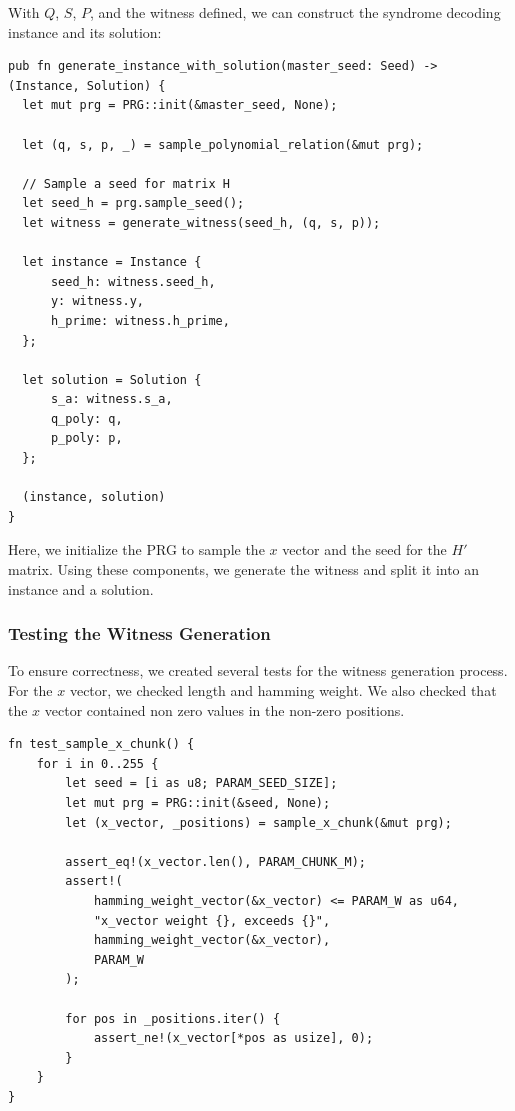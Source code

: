 \documentclass[11pt]{report}
\theoremstyle{definition}
\theoremstyle{plain}
\begin{document}
With $Q$, $S$, $P$, and the witness defined, we can construct the syndrome decoding instance and its solution:

\begin{verbatim}
pub fn generate_instance_with_solution(master_seed: Seed) -> (Instance, Solution) {
  let mut prg = PRG::init(&master_seed, None);

  let (q, s, p, _) = sample_polynomial_relation(&mut prg);

  // Sample a seed for matrix H
  let seed_h = prg.sample_seed();
  let witness = generate_witness(seed_h, (q, s, p));

  let instance = Instance {
      seed_h: witness.seed_h,
      y: witness.y,
      h_prime: witness.h_prime,
  };

  let solution = Solution {
      s_a: witness.s_a,
      q_poly: q,
      p_poly: p,
  };

  (instance, solution)
}
\end{verbatim}

Here, we initialize the PRG to sample the $x$ vector and the seed for the $H'$ matrix. Using these components, we generate the witness and split it into an instance and a solution.

\subsubsection{Testing the Witness Generation}\label{sub:testing_our_witness_generation}

To ensure correctness, we created several tests for the witness generation process. For the $x$ vector, we checked length and hamming weight. We also checked that the $x$ vector contained non zero values in the non-zero positions.

\begin{verbatim}
fn test_sample_x_chunk() {
    for i in 0..255 {
        let seed = [i as u8; PARAM_SEED_SIZE];
        let mut prg = PRG::init(&seed, None);
        let (x_vector, _positions) = sample_x_chunk(&mut prg);

        assert_eq!(x_vector.len(), PARAM_CHUNK_M);
        assert!(
            hamming_weight_vector(&x_vector) <= PARAM_W as u64,
            "x_vector weight {}, exceeds {}",
            hamming_weight_vector(&x_vector),
            PARAM_W
        );

        for pos in _positions.iter() {
            assert_ne!(x_vector[*pos as usize], 0);
        }
    }
}
\end{verbatim}
\end{document}
